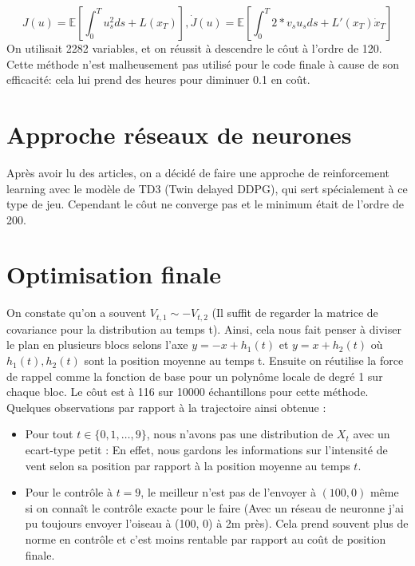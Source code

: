 \documentclass[12pt]{article}
\begin{document}
\[
    J(u) = \mathbb{E} \left[ \int_0^T u_s^2 ds + L(x_T) \right], \dot{J}(u) = \mathbb{E}\left[ \int_0^T 2 * v_s u_s ds + L'(x_T)\dot{x}_T \right]
\]
On utilisait 2282 variables, et on réussit à descendre le côut à l'ordre de 120. Cette méthode n'est malheusement pas utilisé pour le code finale à cause de son efficacité: cela lui prend des heures pour diminuer 0.1 en coût.

\section{Approche réseaux de neurones}
Après avoir lu des articles, on a décidé de faire une approche de reinforcement learning avec le modèle de TD3 (Twin delayed DDPG), qui sert spécialement à ce type de jeu. Cependant le côut ne converge pas et le minimum était de l'ordre de 200.

\section{Optimisation finale}
On constate qu'on a souvent $V_{t, 1} \sim -V_{t, 2}$ (Il suffit de regarder la matrice de covariance pour la distribution au temps t). Ainsi, cela nous fait penser à diviser le plan en plusieurs blocs selons l'axe $y=-x + h_1(t)$ et $y = x + h_2(t)$ où $h_1(t), h_2(t)$ sont la position moyenne au temps t. Ensuite on réutilise la force de rappel comme la fonction de base pour un polynôme locale de degré 1 sur chaque bloc. Le côut est à 116 sur 10000 échantillons pour cette méthode. Quelques observations par rapport à la trajectoire ainsi obtenue :
\begin{itemize}
    \item Pour tout $t \in \{0, 1, \dots, 9\}$, nous n'avons pas une distribution de $X_t$ avec un ecart-type petit : En effet, nous gardons les informations sur l'intensité de vent selon sa position par rapport à la position moyenne au temps $t$.
    \item Pour le contrôle à $t=9$, le meilleur n'est pas de l'envoyer à $(100, 0)$ même si on connaît le contrôle exacte pour le faire (Avec un réseau de neuronne j'ai pu toujours envoyer l'oiseau à (100, 0) à 2m près). Cela prend souvent plus de norme en contrôle et c'est moins rentable par rapport au coût de position finale.
\end{itemize}
\end{document}
